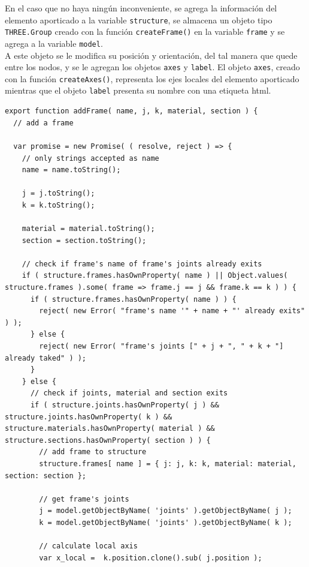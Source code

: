 En el caso que no haya ningún inconveniente, se agrega la información del elemento aporticado a la variable \verb|structure|, se almacena un objeto tipo \verb|THREE.Group| creado con la función \verb|createFrame()| en la variable \verb|frame| y se agrega a la variable \verb|model|.\\

A este objeto se le modifica su posición y orientación, del tal manera que quede entre los nodos, y se le agregan los objetos \verb|axes| y \verb|label|. El objeto \verb|axes|, creado con la función \verb|createAxes()|, representa los ejes locales del elemento aporticado mientras que el objeto \verb|label| presenta su nombre con una etiqueta html.\\

\begin{lstlisting}[language={},caption=Función \texttt{addFrame()} implementada en el archivo \texttt{FEM.js}.,label=alg:FEM.js-addFrame, frame=single]
export function addFrame( name, j, k, material, section ) {
  // add a frame
  
  var promise = new Promise( ( resolve, reject ) => {  
    // only strings accepted as name
    name = name.toString();

    j = j.toString();
    k = k.toString();
    
    material = material.toString();
    section = section.toString();

    // check if frame's name of frame's joints already exits
    if ( structure.frames.hasOwnProperty( name ) || Object.values( structure.frames ).some( frame => frame.j == j && frame.k == k ) ) {
      if ( structure.frames.hasOwnProperty( name ) ) { 
        reject( new Error( "frame's name '" + name + "' already exits" ) );
      } else {
        reject( new Error( "frame's joints [" + j + ", " + k + "] already taked" ) );
      }
    } else {
      // check if joints, material and section exits
      if ( structure.joints.hasOwnProperty( j ) && structure.joints.hasOwnProperty( k ) && structure.materials.hasOwnProperty( material ) && structure.sections.hasOwnProperty( section ) ) {
        // add frame to structure
        structure.frames[ name ] = { j: j, k: k, material: material, section: section };
    
        // get frame's joints
        j = model.getObjectByName( 'joints' ).getObjectByName( j );
        k = model.getObjectByName( 'joints' ).getObjectByName( k );
    
        // calculate local axis
        var x_local =  k.position.clone().sub( j.position );
    

\end{lstlisting}
